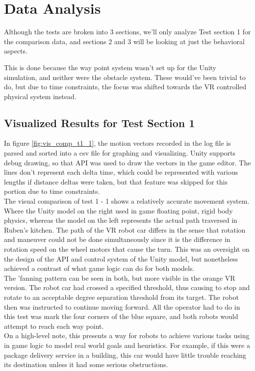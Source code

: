 \documentclass[10pt,a4paper]{article}
\begin{document}
	
	\section*{Data Analysis}
	Although the tests are broken into 3 sections, we'll only analyze Test section 1 for the comparison data, and sections 2 and 3 will be looking at just the behavioral aspects.
	
	This is done because the way point system wasn't set up for the Unity simulation, and neither were the obstacle system. These would've been trivial to do, but due to time constraints, the focus was shifted towards the VR controlled physical system instead.
	
	\subsection*{Visualized Results for Test Section 1}
	In figure \ref{fig:vis_comp_t1_1}, the motion vectors recorded in the log file is parsed and sorted into a csv file for graphing and visualizing. Unity supports debug drawing, so that API was used to draw the vectors in the game editor. The lines don't represent each delta time, which could be represented with various lengths if distance deltas were taken, but that feature was skipped for this portion due to time constraints.
	\\
	The visual comparison of test 1 - 1 shows a relatively accurate movement system. Where the Unity model on the right used in game floating point, rigid body physics, whereas the model on the left represents the actual path traversed in Ruben's kitchen. The path of the VR robot car differs in the sense that rotation and maneuver could not be done simultaneously since it is the difference in rotation speed on the wheel motors that cause the turn. This was an oversight on the design of the API and control system of the Unity model, but nonetheless achieved a contrast of what game logic can do for both models.
	\\
	The 'fanning pattern can be seen in both, but more visible in the orange VR version. The robot car had crossed a specified threshold, thus causing to stop and rotate to an acceptable degree separation threshold from its target. The robot then was instructed to continue moving forward. All the operator had to do in this test was mark the four corners of the blue square, and both robots would attempt to reach each way point.
	\\
	On a high-level note, this presents a way for robots to achieve various tasks using in game logic to model real world goals and heuristics. For example, if this were a package delivery service in a building, this car would have little trouble reaching its destination unless it had some serious obstructions.
\end{document}
